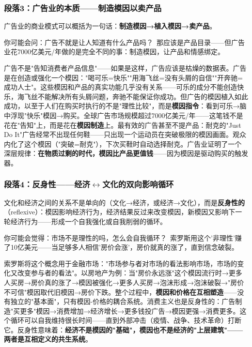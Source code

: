 \documentclass[../main.tex]{subfiles}
\begin{document}
	\subsubsection*{段落3：广告业的本质——制造模因以卖产品}

	广告业的商业模式可以概括为一句话：\textbf{制造模因→植入模因→卖产品}。

	\begin{tcolorbox}[colback=yellow!5, title=\textit{读者行为预测}]

		你可能会问：广告不就是让人知道有什么产品吗？\ 那应该是产品目录——但广告业花7000亿美元/年做的是完全不同的事：制造模因，让产品和情感绑定。

	\end{tcolorbox}

广告不是"告知消费者产品信息"——如果是这样，广告应该是枯燥的数据表。广告是在创造或强化一个模因："喝可乐=快乐""用海飞丝=没有头屑的自信""开奔驰=成功人士"。这些模因和产品的真实功能几乎没有关系——可乐的成分不能创造快乐，海飞丝不能解决所有头屑问题，奔驰不能保证你成功。但广告的模因植入如此成功，以至于人们在购买时执行的不是"理性比较"，而是\textbf{模因指令}：看到可乐→脑中浮现"快乐"模因→购买。全球广告市场规模超过7000亿美元/年——这笔钱不是花在"告知"上，而是花在\textbf{模因制造}上。最有效的广告甚至不提产品：耐克的"Just Do It"广告经常不出现任何鞋——只出现一个运动员在突破极限的模因画面。观众内化了这个模因（"突破=耐克"），下次买鞋时自动选择耐克。广告业证明了一个深层规律：\textbf{在物质过剩的时代，模因比产品更值钱}——因为模因是驱动购买的触发器。

	\subsubsection*{段落4：反身性——经济$\leftrightarrow$文化的双向影响循环}

	文化和经济之间的关系不是单向的（文化→经济，或经济→文化），而是\textbf{反身性的}（reflexive）：模因影响经济行为，经济结果反过来改变模因，新模因又影响下一轮经济行为——形成一个自我强化或自我削弱的循环。

	\begin{tcolorbox}[colback=yellow!5, title=\textit{读者行为预测}]

		你可能会觉得：市场不是理性的吗，怎么会自我循环？\ 索罗斯用这个'非理性'赚了10亿美元——当足够多人相信'房价会涨'，房价就真的涨了，直到信念破裂。

	\end{tcolorbox}

索罗斯将这个概念用于金融市场："市场参与者对市场的看法影响市场，市场的变化又改变参与者的看法"。以房地产为例：当"房价永远涨"这个模因流行时→更多人买房→房价真的涨了→模因被强化→更多人买房→泡沫形成→泡沫破裂→"房价不可信"模因取代旧模因→房价下跌。整个过程中，\textbf{模因和价格在互相塑造}——没有独立的"基本面"，只有模因-价格的耦合系统。消费主义也是反身性的：广告制造"买更多"模因→消费增加→经济增长→更多钱投广告→模因更强→消费更多。这个循环可以自我维持很长时间——直到外部冲击（疫情、战争、技术革命）打断它。反身性意味着：\textbf{经济不是模因的"基础"，模因也不是经济的"上层建筑"——两者是互相定义的共生系统}。
\end{document}
